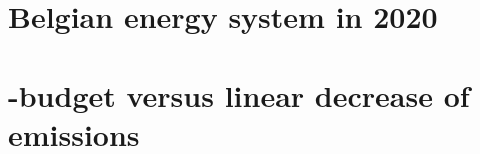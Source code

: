 \documentclass[a4paper,twoside,10pt,final]{memoir} %
\begin{document}






\begin{appendices}

\chapter{Belgian energy system in 2020}
\label{app:bel_2020}


\chapter{-budget versus linear decrease of emissions}
\label{app:CO2_budget}



\end{appendices}
\end{document}
